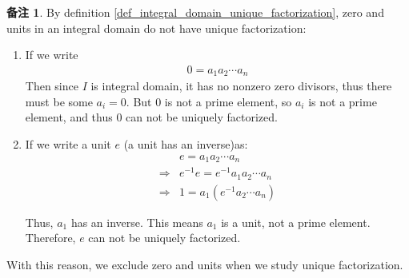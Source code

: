 \documentclass[utf8]{ctexbook}
\theoremstyle{definition}
\newtheorem{memo}{备注}[section]
\begin{document}
\begin{memo}
By definition \ref{def_integral_domain_unique_factorization}, zero and units in an integral domain do not have unique factorization:
\begin{enumerate}
\item{If we write 
\begin{align*}
0 = a_1 a_2 \cdots a_n
\end{align*}
Then since $I$ is integral domain, it has no nonzero zero divisors, thus there must be some $a_i = 0$. But $0$ is not a prime element, so $a_i$ is not a prime element, and thus $0$ can not be uniquely factorized.
}
\item{If we write a unit $e$ (a unit has an inverse)as:
\begin{align*}
& e = a_1 a_2 \cdots a_n \\
\Longrightarrow & e^{-1} e = e^{-1}  a_1 a_2 \cdots a_n \\
\Longrightarrow & 1 = a_1 (e^{-1}  a_2 \cdots a_n )
\end{align*}

Thus, $a_1$ has an inverse. This means $a_1$ is a unit, not a prime element. Therefore, $e$ can not be uniquely factorized.
}
\end{enumerate}

With this reason, we exclude zero and units when we study unique factorization.
\end{memo}
\end{document}
